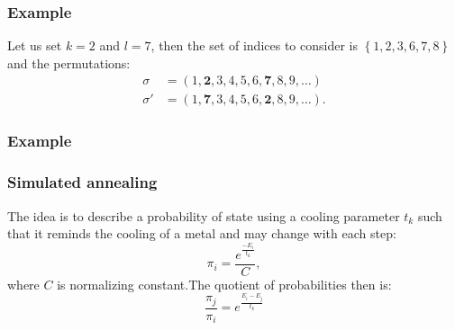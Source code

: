 \begin{frame}
	\frametitle{Example}
	Let us set $k=2$ and $l=7$, then the set of indices to consider is $\left\{ 1,2,3,6,7,8 \right\}$ and the permutations:
	\begin{align*}
	\sigma &= (1, \bm{2}, 3, 4, 5, 6, \bm{7}, 8, 9, \ldots) \\
	\sigma' &= (1, \bm{7}, 3, 4, 5, 6, \bm{2}, 8, 9, \ldots).
	\end{align*}
\end{frame}

\begin{frame}
	\frametitle{Example}
	
\end{frame}

\begin{frame}
	\frametitle{Simulated annealing}
	The idea is to describe a probability of state using a cooling parameter $t_k$ such that it reminds the cooling of a metal and may change with each step:
	\begin{equation*}
	\pi_i = \frac{e^{\frac{-E_i}{t_k}}}{C},
	\end{equation*}
	where $C$ is normalizing constant.The quotient of probabilities then is:
	\begin{equation*}
	\frac{\pi_j}{\pi_i} = e^{\frac{E_i - E_j}{t_k}}
	\end{equation*}
\end{frame}